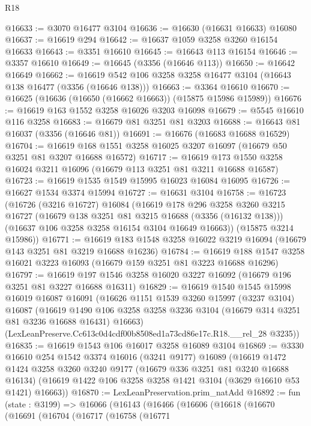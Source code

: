 \begin{lexlean}{R18}
\begin{coremodule}
@16633 := @3070 @16477 @3104
@16636 := @16630 (@16631 @16633) @16080
@16637 := @16619 @294
@16642 := @16637 @1059 @3258 @3260 @16154 @16633
@16643 := @3351 @16610
@16645 := @16643 @113 @16154
@16646 := @3357 @16610
@16649 := @16645 (@3356 (@16646 @113))
@16650 := @16642 @16649
@16662 := @16619 @542 @106 @3258 @3258 @16477 @3104 (@16643 @138 @16477 (@3356 (@16646 @138)))
@16663 := @3364 @16610
@16670 := @16625 (@16636 (@16650 (@16662 @16663)) (@15875 @15986 @15989))
@16676 := @16619 @163 @1552 @3258 @16026 @3203 @16098
@16679 := @5545 @16610 @116 @3258
@16683 := @16679 @81 @3251 @81 @3203
@16688 := @16643 @81 @16037 (@3356 (@16646 @81))
@16691 := @16676 (@16683 @16688 @16529)
@16704 := @16619 @168 @1551 @3258 @16025 @3207 @16097 (@16679 @50 @3251 @81 @3207 @16688 @16572)
@16717 := @16619 @173 @1550 @3258 @16024 @3211 @16096 (@16679 @113 @3251 @81 @3211 @16688 @16587)
@16723 := @16619 @1535 @1549 @15995 @16023 @16084 @16095
@16726 := @16627 @1534 @3374 @15994
@16727 := @16631 @3104
@16758 := @16723
    (@16726
      (@3216 @16727)
      @16084
      (@16619
        @178
        @296
        @3258
        @3260
        @3215
        @16727
        (@16679 @138 @3251 @81 @3215 @16688 (@3356 (@16132 @138)))
        (@16637 @106 @3258 @3258 @16154 @3104 @16649 @16663))
      (@15875 @3214 @15986))
@16771 := @16619 @183 @1548 @3258 @16022 @3219 @16094 (@16679 @143 @3251 @81 @3219 @16688 @16236)
@16784 := @16619 @188 @1547 @3258 @16021 @3223 @16093 (@16679 @159 @3251 @81 @3223 @16688 @16296)
@16797 := @16619 @197 @1546 @3258 @16020 @3227 @16092 (@16679 @196 @3251 @81 @3227 @16688 @16311)
@16829 := @16619
    @1540
    @1545
    @15998
    @16019
    @16087
    @16091
    (@16626
      @1151
      @1539
      @3260
      @15997
      (@3237 @3104)
      @16087
      (@16619 @1490 @106 @3258 @3258 @3236 @3104 (@16679 @314 @3251 @81 @3236 @16688 @16431) @16663)
      (LexLeanPreserve.Cc613c0d4cdf00b8508ed1a73cd86e17c.R18.__rel_28 @3235))
@16835 := @16619 @1543 @106 @16017 @3258 @16089 @3104
@16869 := @3330
    @16610
    @254
    @1542
    @3374
    @16016
    (@3241 @9177)
    @16089
    (@16619
      @1472
      @1424
      @3258
      @3260
      @3240
      @9177
      (@16679 @336 @3251 @81 @3240 @16688 @16134)
      (@16619 @1422 @106 @3258 @3258 @1421 @3104 (@3629 @16610 @53 @1421) @16663))
@16870 := LexLeanPreservation.prim_natAdd
@16892 := fun (state : @3199) =>
  @16066
    (@16143
      (@16466
        (@16606
          (@16618
            (@16670
              (@16691
                (@16704
                  (@16717
                    (@16758
                      (@16771

\end{coremodule}
\end{lexlean}
